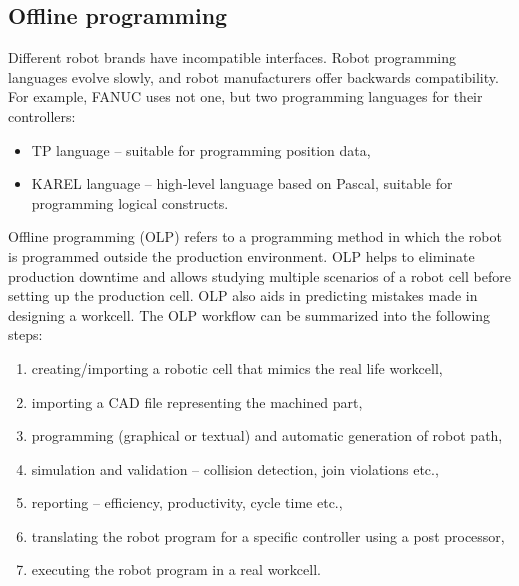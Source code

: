 \subsection{Offline programming}
Different robot brands have incompatible interfaces. Robot programming languages evolve slowly, and robot manufacturers offer backwards compatibility. For example, FANUC uses not one, but two programming languages for their controllers: 

\begin{itemize}

 \item TP language -- suitable for programming position data,
 \item KAREL language -- high-level language based on Pascal, suitable for programming logical constructs.

\end{itemize}

Offline programming  (OLP) refers to a programming method in which the robot is programmed outside the production environment. OLP helps to eliminate production downtime and allows studying multiple scenarios of a robot cell before setting up the production cell. OLP also aids in predicting mistakes made in designing a workcell. The OLP workflow can be summarized into the following steps:

\begin{enumerate}
  \item creating/importing a robotic cell that mimics the real life workcell,
  \item importing a CAD file representing the machined part,
  \item programming (graphical or textual) and automatic generation of robot path,
  \item simulation and validation -- collision detection, join violations etc.,
  \item reporting -- efficiency, productivity, cycle time etc.,
  \item translating the robot program for a specific controller using a post processor,
  \item executing the robot program in a real workcell.
\end{enumerate}
